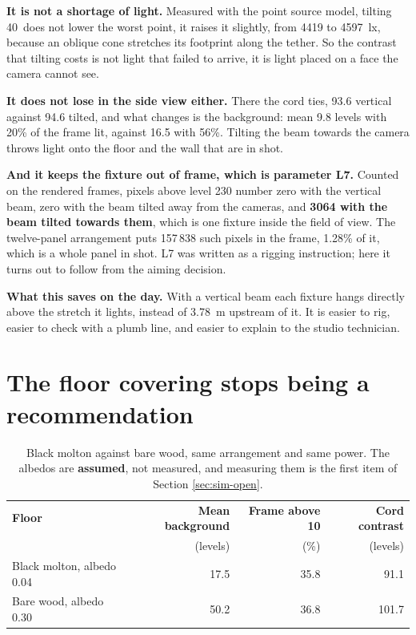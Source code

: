 \textbf{It is not a shortage of light.} Measured with the point source model,
tilting 40\textdegree\ does not lower the worst point, it raises it slightly,
from 4419 to 4597~lx, because an oblique cone stretches its footprint along
the tether. So the contrast that tilting costs is not light that failed to
arrive, it is light placed on a face the camera cannot see.

\textbf{It does not lose in the side view either.} There the cord ties, 93.6
vertical against 94.6 tilted, and what changes is the background: mean 9.8
levels with 20\% of the frame lit, against 16.5 with 56\%. Tilting the beam
towards the camera throws light onto the floor and the wall that are in shot.

\textbf{And it keeps the fixture out of frame, which is parameter L7.}
Counted on the rendered frames, pixels above level 230 number zero with the
vertical beam, zero with the beam tilted away from the cameras, and
\textbf{3064 with the beam tilted towards them}, which is one fixture inside
the field of view. The twelve-panel arrangement puts 157\,838 such pixels in
the frame, 1.28\% of it, which is a whole panel in shot. L7 was written as a
rigging instruction; here it turns out to follow from the aiming decision.

\textbf{What this saves on the day.} With a vertical beam each fixture hangs
directly above the stretch it lights, instead of 3.78~m upstream of it. It is
easier to rig, easier to check with a plumb line, and easier to explain to
the studio technician.

\section{The floor covering stops being a recommendation}
\label{sec:sim-cloth}

\begin{table}[htbp]
\centering
\caption[Floor covering]{Black molton against bare wood, same arrangement and
same power. The albedos are \textbf{assumed}, not measured, and measuring
them is the first item of Section \ref{sec:sim-open}.}
\label{tab:floor}
\begin{tabularx}{\textwidth}{@{}X r r r@{}}
\toprule
\textbf{Floor} & \textbf{Mean background} & \textbf{Frame above 10} &
\textbf{Cord contrast} \\
 & (levels) & (\%) & (levels) \\
\midrule
Black molton, albedo 0.04 & 17.5 & 35.8 & 91.1 \\
Bare wood, albedo 0.30 & 50.2 & 36.8 & 101.7 \\
\bottomrule
\end{tabularx}
\end{table}

